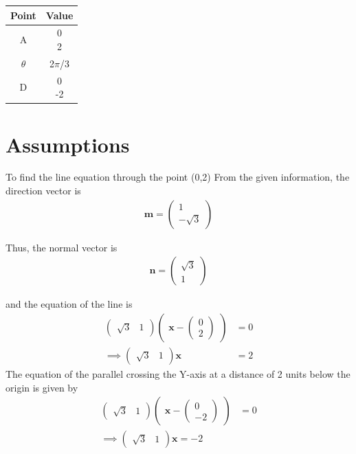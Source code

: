 \documentclass[journal,10pt,twocolumn]{article}
\let\vec\mathbf
\newcommand{\myvec}[1]{\ensuremath{\begin{pmatrix}#1\end{pmatrix}}}
\begin{document}
\begin{tabular}{|c|c|}
	\hline
	\textbf{Point}&\textbf{Value}\\
	\hline
	A&\myvec{0\\2}\\
	\hline
	$\theta$&2$\pi$/3\\
	\hline
	D&\myvec{0\\-2}\\
	\hline
	
	
\end{tabular}


\section*{Assumptions}
To find the line equation  through the point (0,2)
\vspace*{3mm}
\fi
From the  given information, the direction vector is
\begin{align}
	\vec{m}=\myvec{1\\-\sqrt{3}}
\end{align}
  
Thus, 
the normal vector is
\begin{align}
	\vec{n}=\myvec{\sqrt{3}\\1}
\end{align}

and the 
equation of the line is 
\begin{align}
	\myvec{\sqrt{3} &1}\myvec{\vec{x}-\myvec{0\\2}}&=0
	\\
	\implies 
	\myvec{\sqrt{3}&1}
	\vec{x}&=2
\end{align}
The equation of the parallel crossing the Y-axis at a distance of 2 units below the origin is given by 
\begin{align}
	\myvec{\sqrt{3} &1}\myvec{\vec{x}-\myvec{0\\-2}}&=0
	\\
	\implies 
	\myvec{\sqrt{3}&1}
\vec{x}=-2
\end{align}
\end{document}
